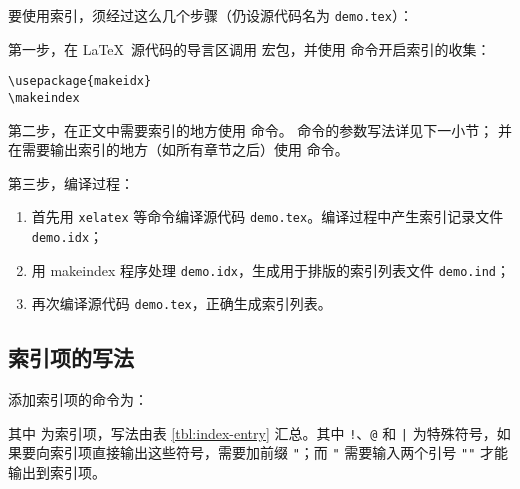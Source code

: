 要使用索引，须经过这么几个步骤（仍设源代码名为 \texttt{demo.tex}）：

第一步，在 \LaTeX\ 源代码的导言区调用  宏包，并使用  命令开启索引的收集：
\begin{verbatim}
\usepackage{makeidx}
\makeindex
\end{verbatim}

第二步，在正文中需要索引的地方使用  命令。 命令的参数写法详见下一小节；
并在需要输出索引的地方（如所有章节之后）使用  命令。

第三步，编译过程：

\begin{enumerate}
  \item 首先用 \texttt{xelatex} 等命令编译源代码 \texttt{demo.tex}。编译过程中产生索引记录文件 \texttt{demo.idx}；
  \item 用 makeindex 程序处理 \texttt{demo.idx}，生成用于排版的索引列表文件 \texttt{demo.ind}；
  \item 再次编译源代码 \texttt{demo.tex}，正确生成索引列表。
\end{enumerate}

\subsection{索引项的写法}\label{subsec:index-entry}

添加索引项的命令为：
\begin{command}
\end{command}

其中  为索引项，写法由表 \ref{tbl:index-entry} 汇总。其中 \texttt!、\texttt @ 和 \texttt| 
为特殊符号，如果要向索引项直接输出这些符号，需要加前缀 \texttt"；而 \texttt" 需要输入两个引号 \texttt{""} 才能输出到索引项。

